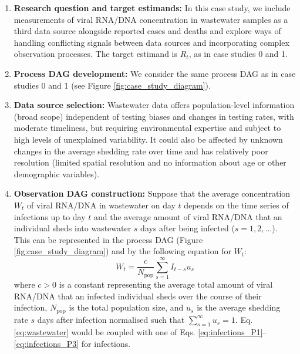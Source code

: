 \documentclass{article}
\begin{document}
\begin{enumerate}
   \item \textbf{Research question and target estimands:} In this case study, we include measurements of viral RNA/DNA concentration in wastewater samples as a third data source alongside reported cases and deaths and explore ways of handling conflicting signals between data sources and incorporating complex observation processes. The target estimand is $R_t$, as in case studies 0 and 1.
   
    \item \textbf{Process DAG development:} We consider the same process DAG as in case studies 0 and 1  (see Figure \ref{fig:case_study_diagram}).

    \item \textbf{Data source selection:} Wastewater data offers population-level information (broad scope) independent of testing biases and changes in testing rates, with moderate timeliness, but requiring environmental expertise and subject to high levels of unexplained variability. It could also be affected by unknown changes in the average shedding rate over time and has relatively poor resolution (limited spatial resolution and no information about age or other demographic variables). 

    
    \item \textbf{Observation DAG construction:} 
    Suppose that the average concentration $W_t$ of viral RNA/DNA in wastewater on day $t$ depends on the time series of infections up to day $t$ and the average amount of viral RNA/DNA that an individual sheds into wastewater $s$ days after being infected ($s=1,2,\ldots$). This can be represented in the process DAG (Figure \ref{fig:case_study_diagram}) and by the following equation for $W_t$:
    \begin{equation} \label{eq:wastewater}
        W_t = \frac{c}{N_\mathrm{pop}}\sum_{s=1}^\infty I_{t-s}u_s 
    \end{equation}
    where $c>0$ is a constant representing the average total amount of viral RNA/DNA that an infected individual sheds over the course of their infection, $N_\mathrm{pop}$ is the total population size, and $u_s$ is the average shedding rate $s$ days after infection normalised such that $\sum_{s=1}^\infty u_s=1$.  Eq. \eqref{eq:wastewater} would be coupled with one of Eqs. \eqref{eq:infections_P1}--\eqref{eq:infections_P3} for infections.
    

\end{enumerate}
\end{document}
